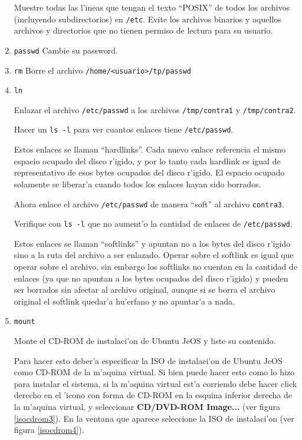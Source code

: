 \begin{enumerate}
Muestre todas las l'ineas que tengan el texto ``POSIX'' de todos los archivos (incluyendo subdirectorios) en \texttt{/etc}.
Evite los archivos binarios y aquellos archivos y directorios que no tienen permiso de lectura para su usuario.

\item \texttt{passwd} Cambie su password.

\item \texttt{rm} Borre el archivo \texttt{/home/<usuario>/tp/passwd}

\item \texttt{ln}

Enlazar el archivo \texttt{/etc/passwd} a los archivos \texttt{/tmp/contra1} y \texttt{/tmp/contra2}.

Hacer un \texttt{ls -l} para ver cuantos enlaces tiene \texttt{/etc/passwd}.

Estos enlaces se llaman ``hardlinks''. Cada nuevo enlace referencia el mismo espacio ocupado del disco r'igido,
y por lo tanto cada hardlink es igual de representativo de esos bytes ocupados del disco r'igido.
El espacio ocupado solamente se liberar'a cuando todos los enlaces hayan sido borrados.

Ahora enlace el archivo \texttt{/etc/passwd} de manera ``soft'' al archivo \texttt{contra3}.

Verifique con \texttt{ls -l} que no aument'o la cantidad de enlaces de \texttt{/etc/passwd}.

Estos enlaces se llaman ``softlinks'' y apuntan no a los bytes del disco r'igido sino a la ruta del archivo a ser enlazado.
Operar sobre el softlink es igual que operar sobre el archivo, sin embargo los softlinks no cuentan en la cantidad de
enlaces (ya que no apuntan a los bytes ocupados del disco r'igido) y pueden ser borrados sin afectar al archivo original,
aunque si se borra el archivo original el softlink quedar'a hu'erfano y no apuntar'a a nada.

\item \texttt{mount}

Monte el CD-ROM de instalaci'on de Ubuntu JeOS y liste su contenido.

Para hacer esto deber'a especificar la ISO de instalaci'on de Ubuntu JeOS como CD-ROM de la m'aquina virtual.
Si bien puede hacer esto como lo hizo para instalar el sistema, si la m'aquina virtual est'a corriendo debe hacer click
derecho en el 'icono con forma de CD-ROM en la esquina inferior derecha de la m'aquina virtual, y seleccionar
\textbf{CD/DVD-ROM Image...} (ver figura \ref{isocdrom3}). En la ventana que aparece seleccione la ISO de instalaci'on
(ver figura \ref{isocdrom4}).


\end{enumerate}
